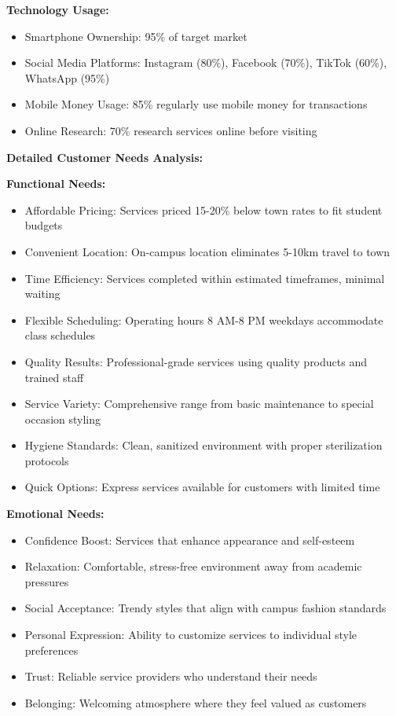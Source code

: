 \textbf{Technology Usage:}
\begin{itemize}[leftmargin=2em]
    \item Smartphone Ownership: 95\% of target market
    \item Social Media Platforms: Instagram (80\%), Facebook (70\%), TikTok (60\%), WhatsApp (95\%)
    \item Mobile Money Usage: 85\% regularly use mobile money for transactions
    \item Online Research: 70\% research services online before visiting
\end{itemize}

\vspace{1em}

\textbf{Detailed Customer Needs Analysis:}

\textbf{Functional Needs:}
\begin{itemize}[leftmargin=2em]
    \item Affordable Pricing: Services priced 15-20\% below town rates to fit student budgets
    \item Convenient Location: On-campus location eliminates 5-10km travel to town
    \item Time Efficiency: Services completed within estimated timeframes, minimal waiting
    \item Flexible Scheduling: Operating hours 8 AM-8 PM weekdays accommodate class schedules
    \item Quality Results: Professional-grade services using quality products and trained staff
    \item Service Variety: Comprehensive range from basic maintenance to special occasion styling
    \item Hygiene Standards: Clean, sanitized environment with proper sterilization protocols
    \item Quick Options: Express services available for customers with limited time
\end{itemize}

\textbf{Emotional Needs:}
\begin{itemize}[leftmargin=2em]
    \item Confidence Boost: Services that enhance appearance and self-esteem
    \item Relaxation: Comfortable, stress-free environment away from academic pressures
    \item Social Acceptance: Trendy styles that align with campus fashion standards
    \item Personal Expression: Ability to customize services to individual style preferences
    \item Trust: Reliable service providers who understand their needs
    \item Belonging: Welcoming atmosphere where they feel valued as customers
\end{itemize}

